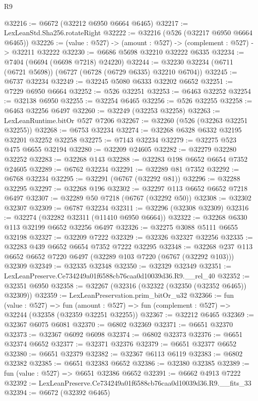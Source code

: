 \begin{lexlean}{R9}
\begin{coremodule}
@32216 := @6672 (@32212 @6950 @6664 @6465)
@32217 := LexLeanStd.Sha256.rotateRight
@32222 := @32216 (@526 (@32217 @6950 @6664 @6465))
@32226 := (value : @527) -> (amount : @527) -> (complement : @527) -> @32211 @32222
@32230 := @6686 @5698 @32210 @32222 @6335
@32234 := @7404 (@6694 (@6698 @7218) @24220)
@32244 := @32230 @32234 (@6711 (@6721 @5698)) (@6727 (@6728 (@6729 @6335) @32210 @6704))
@32245 := @6737 @32234
@32249 := @32245 @5080 @6333 @32202 @6652
@32251 := @7229 @6950 @6664
@32252 := @526 @32251
@32253 := @6463 @32252
@32254 := @32138 @6950
@32255 := @32254 @6465
@32256 := @526 @32255
@32258 := @6463 @32256 @6497
@32260 := @32249 (@32253 @32258)
@32263 := LexLeanRuntime.bitOr @527 @7206
@32267 := @32260 (@526 (@32263 @32251 @32255))
@32268 := @6753 @32234
@32274 := @32268 @6328 @6332 @32195 @32201 @32252 @32258
@32275 := @7143 @32234
@32279 := @32275 @523 @475 @6655 @32194
@32280 := @32209 @24605
@32282 := @32279 @32280 @32252
@32283 := @32268 @143
@32288 := @32283 @198 @6652 @6654 @7352 @24605
@32289 := @6762 @32234
@32291 := @32289 @81 @7352
@32292 := @6768 @32234
@32295 := @32291 (@6767 (@32292 @81))
@32296 := @32288 @32295
@32297 := @32268 @196
@32302 := @32297 @113 @6652 @6652 @7218 @6497
@32307 := @32289 @50 @7218 (@6767 (@32292 @50))
@32308 := @32302 @32307
@32309 := @6787 @32234
@32311 := @32296 (@32308 @32309)
@32316 := @32274 (@32282 @32311 (@11410 @6950 @6664))
@32322 := @32268 @6330 @113 @32199 @6652 @32256 @6497
@32326 := @32275 @3088 @5111 @6655 @32198
@32327 := @32209 @7222
@32329 := @32326 @32327 @32256
@32335 := @32283 @439 @6652 @6654 @7352 @7222 @32295
@32348 := @32268 @237 @113 @6652 @6652 @7220 @6497 (@32289 @103 @7220 (@6767 (@32292 @103))) @32309
@32349 := @32335 @32348
@32350 := @32329 @32349
@32351 := LexLeanPreserve.Ce734249a01f6588cb76caa0d10039d36.R9.__rel_40
@32352 := @32351 @6950
@32358 := @32267 (@32316 (@32322 (@32350 (@32352 @6465)) @32309))
@32359 := LexLeanPreservation.prim_bitOr_u32
@32366 := fun (value : @527) =>
  fun (amount : @527) => fun (complement : @527) => @32244 (@32358 (@32359 @32251 @32255))
@32367 := @32212 @6465
@32369 := @32367 @6075 @6081
@32370 := @6802 @32369
@32371 := @6651 @32370
@32373 := @32367 @6092 @6098
@32374 := @6802 @32373
@32376 := @6651 @32374 @6652
@32377 := @32371 @32376
@32379 := @6651 @32377 @6652
@32380 := @6651 @32379
@32382 := @32367 @6113 @6119
@32383 := @6802 @32382
@32385 := @6651 @32383 @6652
@32386 := @32380 @32385
@32389 := fun (value : @527) => @6651 @32386 @6652
@32391 := @6662 @4913 @7222
@32392 := LexLeanPreserve.Ce734249a01f6588cb76caa0d10039d36.R9.__fits_33
@32394 := @6672 (@32392 @6465)

\end{coremodule}
\end{lexlean}
